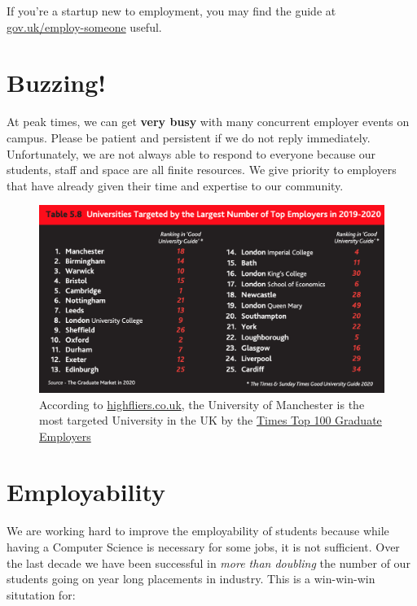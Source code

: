 \documentclass[
  12pt,
]{book}
\begin{document}
If you're a startup new to employment, you may find the guide at \href{https://www.gov.uk/employ-someone}{gov.uk/employ-someone} useful.

\hypertarget{buzzing}{%
\section{Buzzing!}\label{buzzing}}

At peak times, we can get \textbf{very busy} with many concurrent employer events on campus. \citep{highfliers2020} Please be patient and persistent if we do not reply immediately. Unfortunately, we are not always able to respond to everyone because our students, staff and space are all finite resources. We give priority to employers that have already given their time and expertise to our community.



\begin{figure}

{\centering \includegraphics[width=1\linewidth]{images/high-fliers-table} 

}

\caption{According to \href{https://www.highfliers.co.uk}{highfliers.co.uk}, the University of Manchester is the most targeted University in the UK by the \href{https://www.top100graduateemployers.com}{Times Top 100 Graduate Employers} \citep{highfliers2020}}\label{fig:unnamed-chunk-4}
\end{figure}

\hypertarget{employability}{%
\section{Employability}\label{employability}}

We are working hard to improve the employability of students because while having a Computer Science is necessary for some jobs, it is not sufficient. \citep{unemployed, shadboltreview, fincherreview, finchergecco} Over the last decade we have been successful in \emph{more than doubling} the number of our students going on year long placements in industry. This is a win-win-win situtation for:
\end{document}
